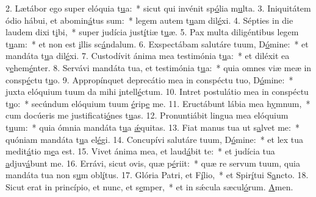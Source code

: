2. Lætábor ego super elóquia t\uline{u}a:~* sicut qui invénit sp\uline{ó}lia m\uline{u}lta.
3. Iniquitátem ódio hábui, et abomin\uline{á}tus sum:~* legem autem t\uline{u}am dil\uline{é}xi.
4. Sépties in die laudem dixi t\uline{i}bi,~* super judícia just\uline{í}tiæ t\uline{u}æ.
5. Pax multa diligéntibus legem t\uline{u}am:~* et non est \uline{i}llis sc\uline{á}ndalum.
6. Exspectábam salutáre tuum, D\uline{ó}mine:~* et mandáta t\uline{u}a dil\uline{é}xi.
7. Custodívit ánima mea testimónia t\uline{u}a:~* et diléxit ea v\uline{e}hem\uline{é}nter.
8. Servávi mandáta tua, et testimónia t\uline{u}a:~* quia omnes viæ meæ in consp\uline{é}ctu t\uline{u}o.
9. Appropínquet deprecátio mea in conspéctu tuo, D\uline{ó}mine:~* juxta elóquium tuum da mihi \uline{i}ntell\uline{é}ctum.
10. Intret postulátio mea in conspéctu t\uline{u}o:~* secúndum elóquium tuum \uline{é}rip\uline{e} me.
11. Eructábunt lábia mea h\uline{y}mnum,~* cum docúeris me justificati\uline{ó}nes t\uline{u}as.
12. Pronuntiábit lingua mea elóquium t\uline{u}um:~* quia ómnia mandáta t\uline{u}a \uline{ǽ}quitas.
13. Fiat manus tua ut s\uline{a}lvet me:~* quóniam mandáta t\uline{u}a el\uline{é}gi.
14. Concupívi salutáre tuum, D\uline{ó}mine:~* et lex tua medit\uline{á}tio m\uline{e}a est.
15. Vivet ánima mea, et laud\uline{á}bit te:~* et judícia tua \uline{a}djuv\uline{á}bunt me.
16. Errávi, sicut ovis, quæ p\uline{é}riit:~* quæ re servum tuum, quia mandáta tua non s\uline{u}m obl\uline{í}tus.
17. Glória Patri, et F\uline{í}lio,~* et Spir\uline{í}tui S\uline{a}ncto.
18. Sicut erat in princípio, et nunc, et s\uline{e}mper,~* et in sǽcula sæcul\uline{ó}rum. \uline{A}men.
